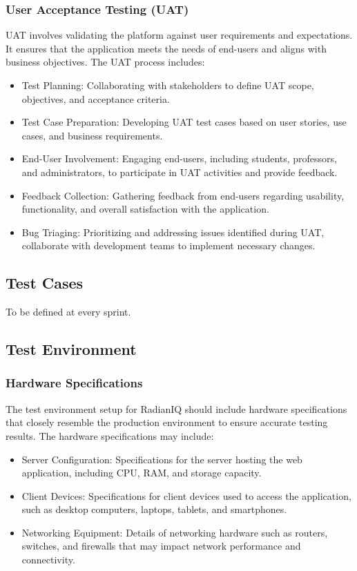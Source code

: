 		\subsubsection{User Acceptance Testing (UAT)}
		
		UAT involves validating the platform against user requirements and expectations. It ensures that the application meets the needs of end-users and aligns with business objectives. The UAT process includes:
		
		\begin{itemize}
			\item Test Planning: Collaborating with stakeholders to define UAT scope, objectives, and acceptance criteria.
			\item Test Case Preparation: Developing UAT test cases based on user stories, use cases, and business requirements.
			\item End-User Involvement: Engaging end-users, including students, professors, and administrators, to participate in UAT activities and provide feedback.
			\item Feedback Collection: Gathering feedback from end-users regarding usability, functionality, and overall satisfaction with the application.
			\item Bug Triaging: Prioritizing and addressing issues identified during UAT, collaborate with development teams to implement necessary changes.
		\end{itemize}
		
		
	\subsection{Test Cases}

	To be defined at every sprint.
	
	\subsection{Test Environment}
	
		\subsubsection{Hardware Specifications}
		
		The test environment setup for RadianIQ should include hardware specifications that closely resemble the production environment to ensure accurate testing results. The hardware specifications may include:
		
		\begin{itemize}
			\item Server Configuration: Specifications for the server hosting the web application, including CPU, RAM, and storage capacity.
			\item Client Devices: Specifications for client devices used to access the application, such as desktop computers, laptops, tablets, and smartphones.
			\item Networking Equipment: Details of networking hardware such as routers, switches, and firewalls that may impact network performance and connectivity.
		\end{itemize}
		
